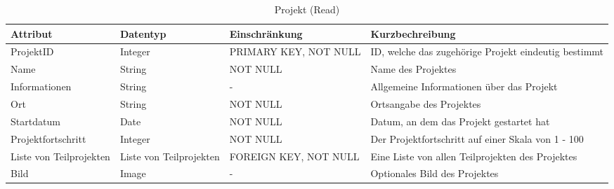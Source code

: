         \begin{table}
         \centering
         \begin{tabularx}{\textwidth}{ X | X | X | X} 
           \textbf{Attribut}  & \textbf{Datentyp} & \textbf{Einschränkung} & \textbf{Kurzbechreibung} \\ \hline \hline
           ProjektID      & Integer   & PRIMARY KEY, NOT NULL  
           & ID, welche das zugehörige Projekt eindeutig bestimmt \\ \hline
           Name           & String    & NOT NULL               
           & Name des Projektes \\ \hline
           Informationen  & String    & -
           & Allgemeine Informationen über das Projekt \\ \hline
           Ort            & String    & NOT NULL 
           & Ortsangabe des Projektes \\ \hline
           Startdatum     & Date      & NOT NULL
           & Datum, an dem das Projekt gestartet hat \\ \hline
           Projektfortschritt & Integer & NOT NULL
           & Der Projektfortschritt auf einer Skala von 1 - 100 \\ \hline
           Liste von Teilprojekten & Liste von Teilprojekten & FOREIGN KEY, NOT NULL
           & Eine Liste von allen Teilprojekten des Projektes \\ \hline
           Bild           & Image     & -
           & Optionales Bild des Projektes \\ \hline
           
         \end{tabularx}
            
         \caption{Projekt (Read)}
    
       \end{table}


